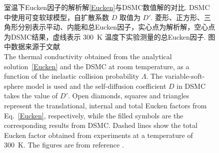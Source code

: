 \begin{figure}[t]
	\centering
	\caption{ 
		室温下Eucken因子的解析解\eqref{Eucken}与DSMC数值解的对比. DSMC中使用可变软球模型，自扩散系数 $D$ 取值为 $D'$. 菱形、正方形、三角形分别表示平动、内能和总Eucken因子，实心点为解析解，空心点为DSMC结果，虚线表示 300~K 温度下实验测量的总Eucken因子. 图中数据来源于文献\cite{Wu2020JFM}\\
		The thermal conductivity obtained from the analytical solution~\eqref{Eucken} and the DSMC at room temperature, as a function of the inelastic collision probability $\Lambda$. The variable-soft-sphere model is used and the self-diffusion coefficient $D$ in DSMC takes the value of $D'$. Open diamonds, squares and triangles represent the translational, internal and total Eucken factors from Eq.~\eqref{Eucken}, respectively, while the filled symbols are the corresponding results from DSMC. Dashed lines show the total Eucken factor obtained from experiments at a temperature of 300~K. The figures are from reference \cite{Wu2020JFM}.
	}
	\label{fig:DSMC} 
\end{figure}

